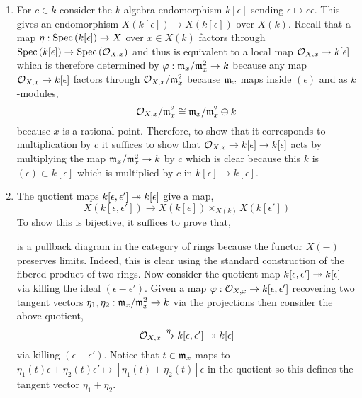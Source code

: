 \documentclass[12pt]{article}
\begin{document}
\begin{enumerate}
\item For $c \in k$ consider the $k$-algebra endomorphism $k[\epsilon]$ sending $\epsilon \mapsto c \epsilon$. This gives an endomorphism $X(k[\epsilon]) \to X(k[\epsilon])$ over $X(k)$. Recall that a map $\eta : \mathrm{Spec}\left( k[\epsilon] \right) \to X$ over $x \in X(k)$ factors through $\mathrm{Spec}\left( k[\epsilon] \right) \to \mathrm{Spec}\left( \mathcal{O}_{X, x} \right)$ and thus is equivalent to a local map $\mathcal{O}_{X, x} \to k[\epsilon]$ which is therefore determined by $\varphi : \mathfrak{m}_x / \mathfrak{m}_x^2 \to k$ because any map $\mathcal{O}_{X, x} \to k[\epsilon]$ factors through $\mathcal{O}_{X, x} / \mathfrak{m}_x^2$ because $\mathfrak{m}_x$ maps inside $(\epsilon)$ and as $k$-modules,
\[ \mathcal{O}_{X, x} / \mathfrak{m}_x^2 \cong \mathfrak{m}_x / \mathfrak{m}_x^2 \oplus k \]
because $x$ is a rational point. Therefore, to show that it corresponds to multiplication by $c$ it suffices to show that $\mathcal{O}_{X, x} \to k[\epsilon] \to k[\epsilon]$ acts by multiplying the map $\mathfrak{m}_x / \mathfrak{m}_x^2 \to k$ by $c$ which is clear because this $k$ is $(\epsilon) \subset k[\epsilon]$ which is multiplied by $c$ in $k[\epsilon] \to k[\epsilon]$.

\item The quotient maps $k[\epsilon,\epsilon'] \twoheadrightarrow k[\epsilon]$ give a map,
\[ X(k[\epsilon, \epsilon']) \to X(k[\epsilon]) \times_{X(k)} X(k[\epsilon']) \]
To show this is bijective, it suffices to prove that,
\begin{center}
\end{center}
is a pullback diagram in the category of rings because the functor $X(-)$ preserves limits. Indeed, this is clear using the standard construction of the fibered product of two rings. Now consider the quotient map $k[\epsilon, \epsilon'] \twoheadrightarrow k[\epsilon]$ via killing the ideal $(\epsilon - \epsilon')$. Given a map $\varphi : \mathcal{O}_{X, x} \to k[\epsilon, \epsilon']$ recovering two tangent vectors $\eta_1, \eta_2 : \mathfrak{m}_x / \mathfrak{m}_x^2 \to k$ via the projections then consider the above quotient,
\[ \mathcal{O}_{X, x} \xrightarrow{\eta} k[\epsilon, \epsilon'] \twoheadrightarrow k[\epsilon] \]
via killing $(\epsilon - \epsilon')$. Notice that $t \in \mathfrak{m}_x$ maps to $\eta_1(t) \epsilon + \eta_2(t) \epsilon' \mapsto [\eta_1(t) + \eta_2(t)] \epsilon$ in the quotient so this defines the tangent vector $\eta_1 + \eta_2$.


\end{enumerate}
\end{document}
